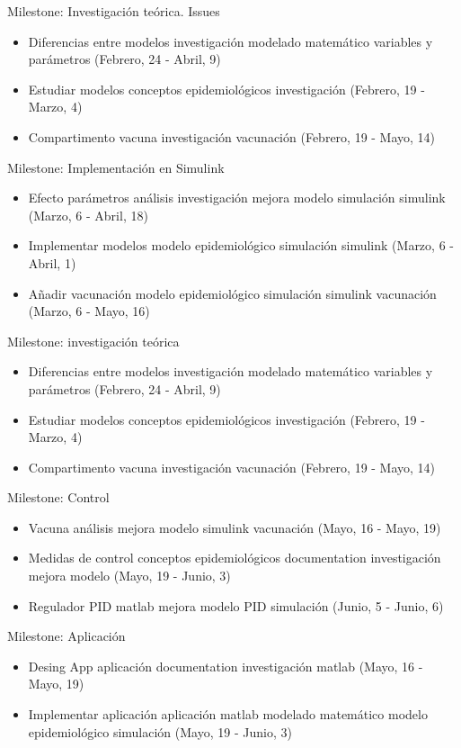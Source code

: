 Milestone: Investigación teórica. Issues
\begin{itemize}
    \item Diferencias entre modelos investigación modelado matemático variables y parámetros (Febrero, 24 - Abril, 9)
    \item Estudiar modelos conceptos epidemiológicos investigación (Febrero, 19 - Marzo, 4)
    \item Compartimento vacuna investigación vacunación (Febrero, 19 - Mayo, 14)
\end{itemize}

Milestone: Implementación en Simulink
\begin{itemize}
    \item Efecto parámetros análisis investigación mejora modelo simulación simulink (Marzo, 6 - Abril, 18)
    \item Implementar modelos modelo epidemiológico simulación simulink (Marzo, 6 - Abril, 1)
    \item Añadir vacunación modelo epidemiológico simulación simulink vacunación (Marzo, 6 - Mayo, 16)
\end{itemize}

Milestone: investigación teórica
\begin{itemize}
    \item Diferencias entre modelos investigación modelado matemático variables y parámetros (Febrero, 24 - Abril, 9)
    \item Estudiar modelos conceptos epidemiológicos investigación (Febrero, 19 - Marzo, 4)
    \item Compartimento vacuna investigación vacunación (Febrero, 19 - Mayo, 14)
\end{itemize}

Milestone: Control
\begin{itemize}
    \item Vacuna análisis mejora modelo simulink vacunación (Mayo, 16 - Mayo, 19)
    \item Medidas de control conceptos epidemiológicos documentation investigación mejora modelo (Mayo, 19 - Junio, 3)
    \item Regulador PID matlab mejora modelo PID simulación (Junio, 5 - Junio, 6)
\end{itemize}

Milestone: Aplicación
\begin{itemize}
    \item Desing App aplicación documentation investigación matlab (Mayo, 16 - Mayo, 19)
    \item Implementar aplicación aplicación matlab modelado matemático modelo epidemiológico simulación (Mayo, 19 - Junio, 3)
\end{itemize}


